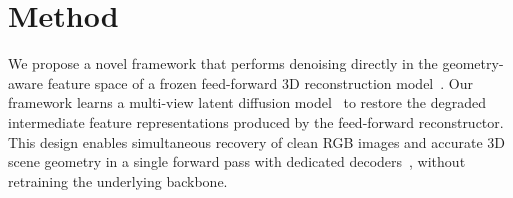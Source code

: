 



\section{Method}
We propose a novel framework that performs denoising directly in the geometry-aware feature space of a frozen feed-forward 3D reconstruction model~\cite{depthanything3}. Our framework learns a multi-view latent diffusion model~\cite{wang2025ddt, zheng2025diffusion} to restore the degraded intermediate feature representations produced by the feed-forward reconstructor. This design enables simultaneous recovery of clean RGB images and accurate 3D scene geometry in a single forward pass with dedicated decoders~\cite{depthanything3, jang2026gld}, without retraining the underlying backbone.


